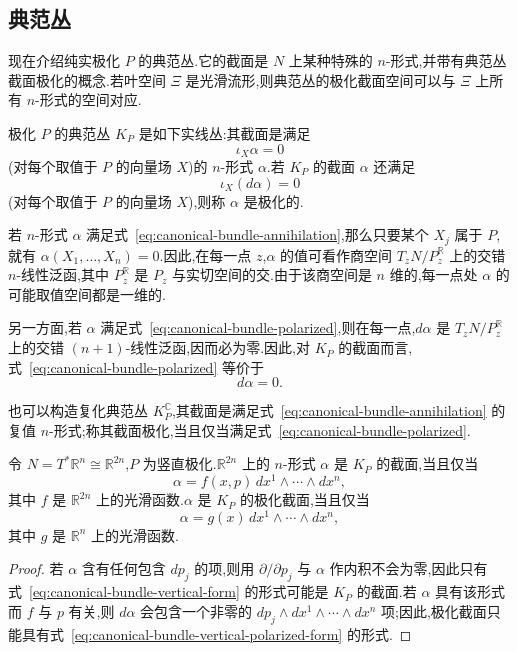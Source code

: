 {\subsection{典范丛}
\label{subsec:canonical-bundle-real-polarization}

现在介绍纯实极化 $P$ 的典范丛.它的截面是 $N$ 上某种特殊的 $n$-形式,并带有典范丛截面极化的概念.若叶空间 $\Xi$ 是光滑流形,则典范丛的极化截面空间可以与 $\Xi$ 上所有 $n$-形式的空间对应.

\begin{definition}[实极化的典范丛]
\label{def:canonical-bundle-real-polarization}
极化 $P$ 的典范丛 $K_P$ 是如下实线丛:其截面是满足
\[
 \iota_X\alpha=0
 \label{eq:canonical-bundle-annihilation}
\]
(对每个取值于 $P$ 的向量场 $X$)的 $n$-形式 $\alpha$.若 $K_P$ 的截面 $\alpha$ 还满足
\[
 \iota_X(d\alpha)=0
 \label{eq:canonical-bundle-polarized}
\]
(对每个取值于 $P$ 的向量场 $X$),则称 $\alpha$ 是极化的.
\end{definition}

若 $n$-形式 $\alpha$ 满足式~\eqref{eq:canonical-bundle-annihilation},那么只要某个 $X_j$ 属于 $P$,就有 $\alpha(X_1,\ldots,X_n)=0$.因此,在每一点 $z$,$\alpha$ 的值可看作商空间 $T_zN/P_z^{\mathbb R}$ 上的交错 $n$-线性泛函,其中 $P_z^{\mathbb R}$ 是 $P_z$ 与实切空间的交.由于该商空间是 $n$ 维的,每一点处 $\alpha$ 的可能取值空间都是一维的.

另一方面,若 $\alpha$ 满足式~\eqref{eq:canonical-bundle-polarized},则在每一点,$d\alpha$ 是 $T_zN/P_z^{\mathbb R}$ 上的交错 $(n+1)$-线性泛函,因而必为零.因此,对 $K_P$ 的截面而言,式~\eqref{eq:canonical-bundle-polarized} 等价于
\[
 d\alpha=0.
 \label{eq:canonical-bundle-closed}
\]

也可以构造复化典范丛 $K_P^{\mathbb C}$,其截面是满足式~\eqref{eq:canonical-bundle-annihilation} 的复值 $n$-形式;称其截面极化,当且仅当满足式~\eqref{eq:canonical-bundle-polarized}.

\begin{example}[余切丛上的典范丛]
\label{ex:canonical-bundle-cotangent}
令 $N=T^*\mathbb R^n\cong\mathbb R^{2n}$,$P$ 为竖直极化.$\mathbb R^{2n}$ 上的 $n$-形式 $\alpha$ 是 $K_P$ 的截面,当且仅当
\[
 \alpha=f(x,p)\,dx^1\wedge\cdots\wedge dx^n,
 \label{eq:canonical-bundle-vertical-form}
\]
其中 $f$ 是 $\mathbb R^{2n}$ 上的光滑函数.$\alpha$ 是 $K_P$ 的极化截面,当且仅当
\[
 \alpha=g(x)\,dx^1\wedge\cdots\wedge dx^n,
 \label{eq:canonical-bundle-vertical-polarized-form}
\]
其中 $g$ 是 $\mathbb R^n$ 上的光滑函数.
\end{example}

\begin{proof}
若 $\alpha$ 含有任何包含 $dp_j$ 的项,则用 $\partial/\partial p_j$ 与 $\alpha$ 作内积不会为零,因此只有式~\eqref{eq:canonical-bundle-vertical-form} 的形式可能是 $K_P$ 的截面.若 $\alpha$ 具有该形式而 $f$ 与 $p$ 有关,则 $d\alpha$ 会包含一个非零的 $dp_j\wedge dx^1\wedge\cdots\wedge dx^n$ 项;因此,极化截面只能具有式~\eqref{eq:canonical-bundle-vertical-polarized-form} 的形式.
\end{proof}

}

